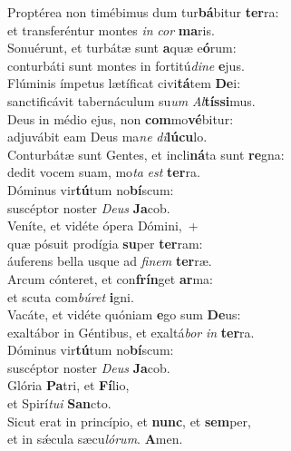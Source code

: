 \evenverse Proptérea non timébimus dum tur\textbf{bá}bitur \textbf{ter}ra:~\*\\
\evenverse et transferéntur montes \textit{in} \textit{cor} \textbf{ma}ris.\\
\oddverse Sonuérunt, et turbátæ sunt \textbf{a}quæ e\textbf{ó}rum:~\*\\
\oddverse conturbáti sunt montes in fortitú\textit{di}\textit{ne} \textbf{e}jus.\\
\evenverse Flúminis ímpetus lætíficat civi\textbf{tá}tem \textbf{De}i:~\*\\
\evenverse sanctificávit tabernáculum su\textit{um} \textit{Al}\textbf{tís}\textbf{si}mus.\\
\oddverse Deus in médio ejus, non \textbf{com}mo\textbf{vé}bitur:~\*\\
\oddverse adjuvábit eam Deus ma\textit{ne} \textit{di}\textbf{lú}\textbf{cu}lo.\\
\evenverse Conturbátæ sunt Gentes, et incli\textbf{ná}ta sunt \textbf{re}gna:~\*\\
\evenverse dedit vocem suam, mo\textit{ta} \textit{est} \textbf{ter}ra.\\
\oddverse Dóminus vir\textbf{tú}tum no\textbf{bí}scum:~\*\\
\oddverse suscéptor noster \textit{De}\textit{us} \textbf{Ja}cob.\\
\evenverse Veníte, et vidéte ópera Dómini,~+\\
\evenverse  quæ pósuit prodígia \textbf{su}per \textbf{ter}ram:~\*\\
\evenverse áuferens bella usque ad \textit{fi}\textit{nem} \textbf{ter}ræ.\\
\oddverse Arcum cónteret, et con\textbf{frín}get \textbf{ar}ma:~\*\\
\oddverse et scuta com\textit{bú}\textit{ret} \textbf{i}gni.\\
\evenverse Vacáte, et vidéte quóniam \textbf{e}go sum \textbf{De}us:~\*\\
\evenverse exaltábor in Géntibus, et exaltá\textit{bor} \textit{in} \textbf{ter}ra.\\
\oddverse Dóminus vir\textbf{tú}tum no\textbf{bí}scum:~\*\\
\oddverse suscéptor noster \textit{De}\textit{us} \textbf{Ja}cob.\\
\evenverse Glória \textbf{Pa}tri, et \textbf{Fí}lio,~\*\\
\evenverse et Spirí\textit{tu}\textit{i} \textbf{San}cto.\\
\oddverse Sicut erat in princípio, et \textbf{nunc}, et \textbf{sem}per,~\*\\
\oddverse et in sǽcula sæcu\textit{ló}\textit{rum}. \textbf{A}men.\\
